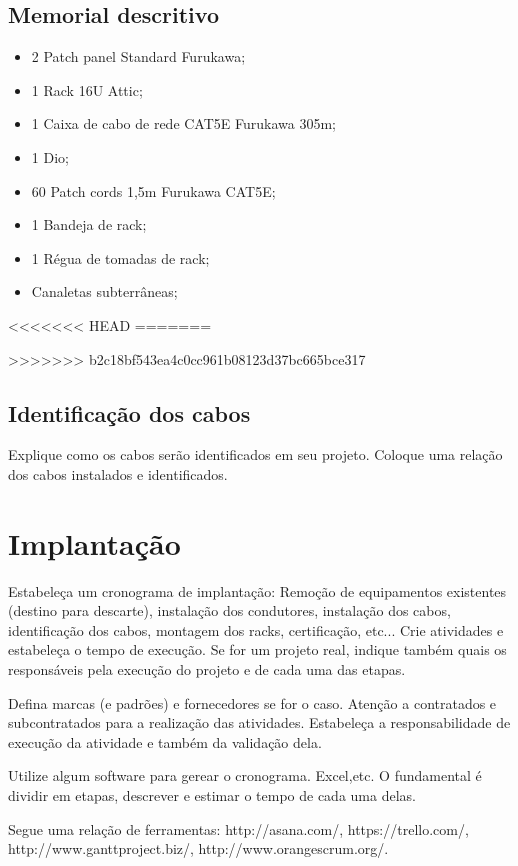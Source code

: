 \documentclass[	DIV=calc,%
							paper=a4,%
							fontsize=12pt,%
							onecolumn]{scrartcl}	 					%
\begin{document}
	

\subsection{Memorial descritivo}

\begin{itemize}
	\item 2 Patch panel Standard Furukawa;
	\item 1 Rack 16U Attic;
 	\item 1 Caixa de cabo de rede CAT5E Furukawa 305m;
 	\item 1 Dio;
 	\item 60 Patch cords 1,5m Furukawa CAT5E;
 	\item 1 Bandeja de rack;
 	\item 1 Régua de tomadas de rack;
 	\item Canaletas subterrâneas;
  	 
\end{itemize}
<<<<<<< HEAD
=======

>>>>>>> b2c18bf543ea4c0cc961b08123d37bc665bce317

\subsection{Identificação dos cabos}
Explique como os cabos serão identificados em seu projeto. Coloque uma relação dos cabos instalados e identificados.

\section{Implantação}
Estabeleça um cronograma de implantação:
Remoção de equipamentos existentes (destino para descarte), instalação dos condutores, instalação dos cabos, 
identificação dos cabos, montagem dos racks, certificação, etc... Crie atividades e estabeleça o tempo de execução. Se for um projeto real, indique também quais os responsáveis pela execução do projeto e de cada uma das etapas.

Defina marcas (e padrões) e fornecedores se for o caso. Atenção a contratados e subcontratados para a realização das atividades. Estabeleça a responsabilidade de execução da atividade e também da validação dela.

Utilize algum software para gerear o cronograma. Excel,etc. O fundamental é dividir em etapas, descrever e estimar o tempo de cada uma delas.

Segue uma relação de ferramentas:
http://asana.com/, 
https://trello.com/, 
http://www.ganttproject.biz/, 
http://www.orangescrum.org/. 
\end{document}
